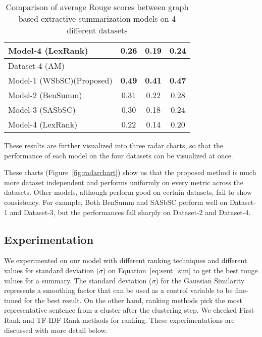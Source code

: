 \begin{table}[]
\begin{tabular}{lccc}
         Model-4 (LexRank)~\cite{Erkan-lexRank-2004}                    & 0.26          & 0.19          & 0.24          \\\hline
         Dataset-4 (AM)                                                 &               &               &               \\\hline
         Model-1 (WSbSC)(Proposed)                                      & \textbf{0.49} & \textbf{0.41} & \textbf{0.47} \\
         Model-2 (BenSumm)~\cite{chowdhury-etal-2021-tfidf-clustering}  & 0.31          & 0.22          & 0.28          \\
         Model-3 (SASbSC)~\cite{roychowdhury-etal-2022-spectral-base}   & 0.30          & 0.18          & 0.24          \\
         Model-4 (LexRank)~\cite{Erkan-lexRank-2004}                    & 0.22          & 0.14          & 0.20          \\
    \end{tabular}
    \caption{Comparison of average Rouge scores between graph based extractive summarization models on 4 different datasets}
    \label{tab:result_comparison-1}
\end{table}

These results are further visualized into three radar charts,
so that the performance of each model on the four datasets can be visualized at once.

These charts (Figure~\ref{fig:radarchart})
show us that the proposed method is much more dataset independent and performs
uniformly on every metric across the datasets.
Other models, although perform good on certain datasets, fail to show consistency.
For example, Both BenSumm and SASbSC perform well on Dataset-1 and Dataset-3, but
the performances fall sharply on Dataset-2 and Dataset-4.

\subsection{Experimentation}\label{subsec:experimentation}
We experimented on our model with different ranking techniques and different values for standard deviation ($\sigma$)
on Equation~\ref{eq:sent_sim} to get the best rouge values for a summary.
The standard deviation ($\sigma$) for the Gaussian Similarity represents a smoothing factor
that can be used as a control variable to be fine-tuned for the best result.
On the other hand, ranking methods pick the most representative sentence from a cluster after the clustering step.
We checked First Rank and TF-IDF Rank methods for ranking.
These experimentations are discussed with more detail below.

